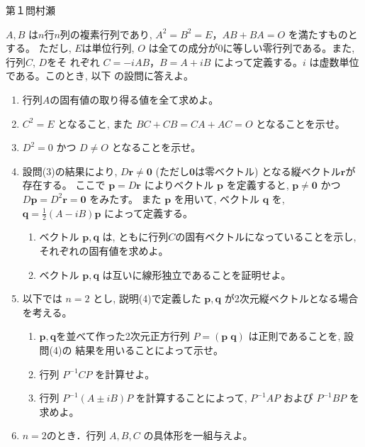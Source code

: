 \begin{question}{第１問}{村瀬}

$A, B$ は$n$行$n$列の複素行列であり, $A^2=B^2=E，AB+BA=O$ を満たすものとする。
ただし, $E$は単位行列, $O$ は全ての成分が0に等しい零行列である。また, 行列$C$, $D$をそ
れぞれ $C=-iAB，B=A+iB$ によって定義する。$i$ は虚数単位である。このとき, 以下
の設問に答えよ。
\begin{enumerate}
\item 行列$A$の固有値の取り得る値を全て求めよ。
\item $C^2=E$ となること, また $BC+CB=CA+AC=O$ となることを示せ。
\item $D^2=0$ かつ $D\ne O$ となることを示せ。
\item 設問(3)の結果により, $D\bm{r}\ne\bm{0}$
  (ただし$\bm{0}$は零ベクトル) となる縦ベクトル$\bm{r}$が存在する。
  ここで $\bm{p}=D\bm{r}$ によりベクトル $\bm{p}$ を定義すると,
  $\bm{p}\ne\bm{0}$ かつ $D\bm{p}=D^2\bm{r}=\bm{0}$ をみたす。
  また $\bm{p}$ を用いて, ベクトル $\bm{q}$ を,  $\bm{q}=\frac12(A-iB)\bm{p}$ によって定義する。
  \begin{enumerate}
  \item ベクトル $\bm{p}, \bm{q}$ は, ともに行列$C$の固有ベクトルになっていることを示し,
    それぞれの固有値を求めよ。
  \item ベクトル $\bm{p}, \bm{q}$ は互いに線形独立であることを証明せよ。
  \end{enumerate}
\item 以下では $n=2$ とし, 説明(4)で定義した $\bm{p}, \bm{q}$ が2次元縦ベクトルとなる場合を考える。
  \begin{enumerate}
  \item $\bm{p}, \bm{q}$を並べて作った2次元正方行列 $P=(\bm{p}\;\bm{q})$ は正則であることを, 設問(4)の
    結果を用いることによって示せ。
  \item 行列 $P^{-1}C P$ を計算せよ。
  \item 行列 $P^{-1}(A\pm iB)P$ を計算することによって, $P^{-1}AP$ およぴ $P^{-1}BP$ を求めよ。
  \end{enumerate}
\item $n=2$のとき．行列 $A, B, C$ の具体形を一組与えよ。
\end{enumerate}

\end{question}
